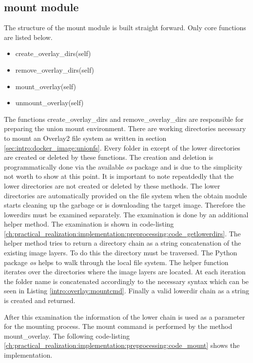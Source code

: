 \subsection{mount module}	
\label{ch:practical_realization:implementation:mount}
The structure of the mount module is built straight forward. Only core functions are listed below.
\begin{itemize}
\item create\_overlay\_dirs(self)
\item remove\_overlay\_dirs(self)
\item mount\_overlay(self)
\item unmount\_overlay(self)
\end{itemize}
The functions create\_overlay\_dirs and remove\_overlay\_dirs are responsible for preparing the union mount environment. 
There are working directories necessary to mount an Overlay2 file system as written in section \ref{sec:intro:docker_image:unionfs}.
Every folder in except of the lower directories are created or deleted by these functions. 
The creation and deletion is programmatically done via the available \textit{os} package and is due to the simplicity not worth to show at this point. 
It is important to note repeatdedly that the lower directories are not created or deleted by these methods. 
The lower directories are automatically provided on the file system when the obtain module starts cleaning up the garbage or is downloading the target image.
Therefore the lowerdirs must be examined separately. The examination is done by an additional helper method. 
The examination is shown in code-listing \ref{ch:practical_realization:implementation:preprocessing:code_getlowerdirs}.
The helper method tries to return a directory chain as a string concatenation of the existing image layers.
To do this the directory must be traversed. 
The Python package \textit{os} helps to walk through the local file system. 
The helper function iterates over the directories where the image layers are located.
At each iteration the folder name is concatenated accordingly to the necessary syntax which can be seen in Listing \ref{intro:overlay:mountcmd}. 
Finally a valid lowerdir chain as a string is created and returned.

After this examination the information of the lower chain is used as a parameter for the mounting process.
The mount command is performed by the method  mount\_overlay. The following code-listing \ref{ch:practical_realization:implementation:preprocessing:code_mount} shows the implementation.
